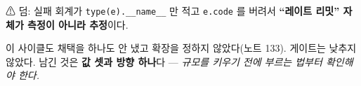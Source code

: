 \documentclass[10pt]{article}
\begin{document}

⚠ 덤: 실패 회계가 \texttt{type(e).\_\_name\_\_} 만 적고 \texttt{e.code} 를
버려서 \textbf{``레이트 리밋'' 자체가 측정이 아니라 추정}이다.

이 사이클도 채택을 하나도 안 냈고 확장을 정하지 않았다(노트 133). 게이트는
낮추지 않았다. 남긴 것은 \textbf{값 셋과 방향 하나}다 --- \emph{규모를 키우기
전에 부르는 법부터 확인해야 한다.}
\end{document}
